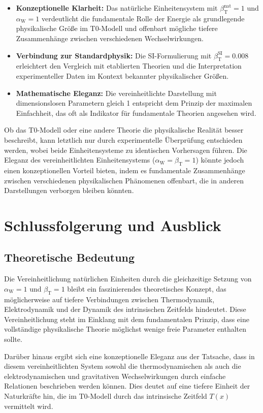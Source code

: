 \documentclass[12pt,a4paper]{article}
\newcommand{\Tfield}{T(x)}
\newcommand{\betaT}{\beta_{\text{T}}}
\newcommand{\alphaW}{\alpha_{\text{W}}}
\begin{document}
	\begin{itemize}
		\item \textbf{Konzeptionelle Klarheit:} Das natürliche Einheitensystem mit \(\betaT^{\text{nat}} = 1\) und \(\alphaW = 1\) verdeutlicht die fundamentale Rolle der Energie als grundlegende physikalische Größe im T0-Modell und offenbart mögliche tiefere Zusammenhänge zwischen verschiedenen Wechselwirkungen.
		\item \textbf{Verbindung zur Standardphysik:} Die SI-Formulierung mit \(\betaT^{\text{SI}} = 0.008\) erleichtert den Vergleich mit etablierten Theorien und die Interpretation experimenteller Daten im Kontext bekannter physikalischer Größen.
		\item \textbf{Mathematische Eleganz:} Die vereinheitlichte Darstellung mit dimensionslosen Parametern gleich 1 entspricht dem Prinzip der maximalen Einfachheit, das oft als Indikator für fundamentale Theorien angesehen wird.
	\end{itemize}
	
	Ob das T0-Modell oder eine andere Theorie die physikalische Realität besser beschreibt, kann letztlich nur durch experimentelle Überprüfung entschieden werden, wobei beide Einheitensysteme zu identischen Vorhersagen führen. Die Eleganz des vereinheitlichten Einheitensystems (\(\alphaW = \betaT = 1\)) könnte jedoch einen konzeptionellen Vorteil bieten, indem es fundamentale Zusammenhänge zwischen verschiedenen physikalischen Phänomenen offenbart, die in anderen Darstellungen verborgen bleiben könnten.
	
	\section{Schlussfolgerung und Ausblick}
	
	\subsection{Theoretische Bedeutung}
	
	Die Vereinheitlichung natürlichen Einheiten durch die gleichzeitige Setzung von \(\alphaW = 1\) und \(\betaT = 1\) bleibt ein faszinierendes theoretisches Konzept, das möglicherweise auf tiefere Verbindungen zwischen Thermodynamik, Elektrodynamik und der Dynamik des intrinsischen Zeitfelds hindeutet. Diese Vereinheitlichung steht im Einklang mit dem fundamentalen Prinzip, dass eine vollständige physikalische Theorie möglichst wenige freie Parameter enthalten sollte.
	
	Darüber hinaus ergibt sich eine konzeptionelle Eleganz aus der Tatsache, dass in diesem vereinheitlichten System sowohl die thermodynamischen als auch die elektrodynamischen und gravitativen Wechselwirkungen durch einfache Relationen beschrieben werden können. Dies deutet auf eine tiefere Einheit der Naturkräfte hin, die im T0-Modell durch das intrinsische Zeitfeld \(\Tfield\) vermittelt wird.
	
\end{document}
